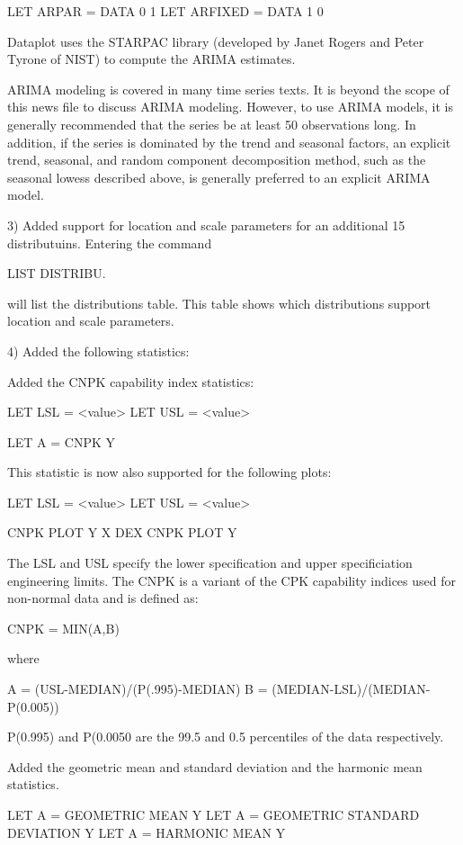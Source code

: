 {           LET ARPAR = DATA 0 1
           LET ARFIXED = DATA 1 0
       
       Dataplot uses the STARPAC library (developed by 
       Janet Rogers and Peter Tyrone of NIST) to compute the
       ARIMA estimates.

       ARIMA modeling is covered in many time series texts.  It is
       beyond the scope of this news file to discuss ARIMA modeling.
       However, to use ARIMA models, it is generally recommended
       that the series be at least 50 observations long.  In addition,
       if the series is dominated by the trend and seasonal factors,
       an explicit trend, seasonal, and random component decomposition
       method, such as the seasonal lowess described above, is
       generally preferred to an explicit ARIMA model.

 3) Added support for location and scale parameters for an additional
    15 distributuins.  Entering the command

         LIST DISTRIBU.

    will list the distributions table.  This table shows which
    distributions support location and scale parameters.

 4) Added the following statistics:

    Added the CNPK capability index statistics:

       LET LSL = <value>
       LET USL = <value>

       LET A = CNPK Y

    This statistic is now also supported for the following plots:

       LET LSL = <value>
       LET USL = <value>

       CNPK PLOT Y X
       DEX CNPK PLOT Y

    The LSL and USL specify the lower specification and upper
    specificiation engineering limits.  The CNPK is a variant of the
    CPK capability indices used for non-normal data and is defined as:

      CNPK = MIN(A,B)

    where

        A = (USL-MEDIAN)/(P(.995)-MEDIAN)
        B = (MEDIAN-LSL)/(MEDIAN-P(0.005))

    P(0.995) and P(0.0050 are the 99.5 and 0.5 percentiles of the
    data respectively.

    Added the geometric mean and standard deviation and the
    harmonic mean statistics.

       LET A = GEOMETRIC MEAN Y
       LET A = GEOMETRIC STANDARD DEVIATION Y
       LET A = HARMONIC MEAN Y

}
